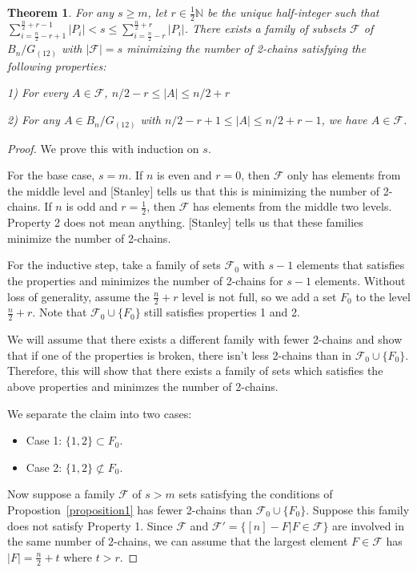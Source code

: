 \documentclass[12pt]{article}
\theoremstyle{plain}
\newtheorem{theorem}{Theorem}
\theoremstyle{definition}
\theoremstyle{remark}
\newcommand{\F}{\mathcal{F}}
\begin{document}
\begin{theorem} For any $s \geq m$, let $r \in \frac{1}{2}\mathbb{N}$ be the unique half-integer such that $\sum_{i = \frac{n}{2} - r +1}^{\frac{n}{2} + r -1} |P_i| < s \leq \sum_{i = \frac{n}{2}-r}^{\frac{n}{2}+r}|P_i|$. There exists a family of subsets $\F$ of $B_n / G_{(12)}$ with $|\F| = s$ minimizing the number of 2-chains satisfying the following properties:

1) For every $A \in \F$, $n/2 - r \leq |A| \leq n/2 + r$

2) For any $A \in B_n / G_{(12)}$ with $n/2 - r + 1 \leq |A| \leq n/2 + r - 1$, we have $A \in \F$.
\end{theorem}

\begin{proof}
We prove this with induction on $s$.

For the base case, $s = m$. If $n$ is even and $r = 0$, then $\F$ only has elements from the middle level and [Stanley] tells us that this is minimizing the number of 2-chains. If $n$ is odd and $r = \frac{1}{2}$, then $\F$ has elements from the middle two levels. Property 2 does not mean anything. [Stanley] tells us that these families minimize the number of 2-chains. 

For the inductive step, take a family of sets $\F_0$ with $s-1$ elements that satisfies the properties and minimizes the number of 2-chains for $s-1$ elements. Without loss of generality, assume the $\frac{n}{2}+r$ level is not full, so we add a set $F_0$ to the level $\frac{n}{2} + r$. Note that $\F_0 \cup \{F_0\}$ still satisfies properties 1 and 2.

We will assume that there exists a different family with fewer 2-chains and show that if one of the properties is broken, there isn't less 2-chains than in $\F_0 \cup \{ F_0\}$. Therefore, this will show that there exists a family of sets which satisfies the above properties and minimzes the number of 2-chains.

We separate the claim into two cases:

\begin{itemize}
\item Case 1: $\{1, 2\} \subset F_0$.
\item Case 2: $\{ 1, 2\} \not\subset F_0$.
\end{itemize}

Now suppose a family $\F$ of $s > m$ sets satisfying the conditions of Propostion~\ref{proposition1} has fewer 2-chains than $\F_0 \cup \{F_0\}$. Suppose this family does not satisfy Property 1. Since $\F$ and $\F' = \{ [n] - F | F \in \F \}$ are involved in the same number of 2-chains, we can assume that the largest element $F \in \F$ has $|F| = \frac{n}{2} + t$ where $t > r$. 


\end{proof}
\end{document}

